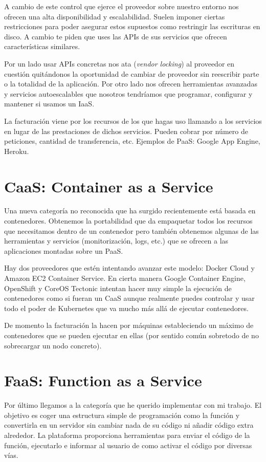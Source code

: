 A cambio de este control que ejerce el proveedor sobre nuestro entorno nos ofrecen una alta disponibilidad y escalabilidad. Suelen imponer ciertas restricciones para poder asegurar estos supuestos como restringir las escrituras en disco. A cambio te piden que uses las APIs de sus servicios que ofrecen características similares.

Por un lado usar APIs concretas nos ata (\emph{vendor locking}) al proveedor en cuestión quitándonos la oportunidad de cambiar de proveedor sin reescribir parte o la totalidad de la aplicación. Por otro lado nos ofrecen herramientas avanzadas y servicios autoescalables que nosotros tendríamos que programar, configurar y mantener si usamos un IaaS.

La facturación viene por los recursos de los que hagas uso llamando a los servicios en lugar de las prestaciones de dichos servicios. Pueden cobrar por número de peticiones, cantidad de transferencia, etc. Ejemplos de PaaS: Google App Engine, Heroku.

\section{CaaS: Container as a Service}

Una nueva categoría no reconocida que ha surgido recientemente está basada en contenedores. Obtenemos la portabilidad que da empaquetar todos los recursos que necesitamos dentro de un contenedor pero también obtenemos algunas de las herramientas y servicios (monitorización, logs, etc.) que se ofrecen a las aplicaciones montadas sobre un PaaS.

Hay dos proveedores que estén intentando avanzar este modelo: Docker Cloud y Amazon EC2 Container Service. En cierta manera Google Container Engine, OpenShift y CoreOS Tectonic intentan hacer muy simple la ejecución de contenedores como si fueran un CaaS aunque realmente puedes controlar y usar todo el poder de Kubernetes que va mucho más allá de ejecutar contenedores.

De momento la facturación la hacen por máquinas estableciendo un máximo de contenedores que se pueden ejecutar en ellas (por sentido común sobretodo de no sobrecargar un nodo concreto).

\section{FaaS: Function as a Service}
\label{sec:faas}

Por último llegamos a la categoría que he querido implementar con mi trabajo. El objetivo es coger una estructura simple de programación como la función y convertirla en un servidor sin cambiar nada de su código ni añadir código extra alrededor. La plataforma proporciona herramientas para enviar el código de la función, ejecutarlo e informar al usuario de como activar el código por diversas vías.

